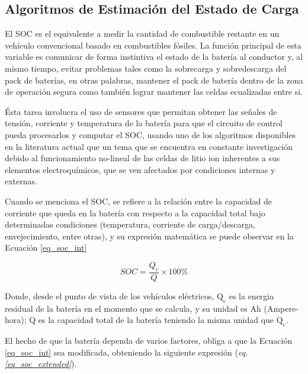 \documentclass[10pt,a4paper]{article}
\begin{document}
\subsection{Algoritmos de Estimaci\'on del Estado de Carga}\label{algSoc}

\noindent El \acrshort{SOC} es el equivalente a medir la cantidad de combustible
restante en un veh\'iculo convencional basado en combustibles f\'osiles. La
funci\'on principal de esta variable es comunicar de forma instintiva el estado
de la bater\'ia al conductor y, al mismo tiempo, evitar problemas tales como la
sobrecarga y sobredescarga del pack de bater\'ias, en otras palabras, mantener
el pack de bater\'ia dentro de la zona de operaci\'on segura como tambi\'en 
lograr mantener las celdas ecualizadas entre si.

\noindent \'Esta tarea involucra el uso de sensores que permitan obtener las
señales de tensi\'on, corriente y temperatura de la bater\'ia para que el
circuito de control pueda procesarlos y computar el \acrshort{SOC},
usando uno de los algoritmos disponibles en la literatura actual que 
un tema que se encuentra en constante investigaci\'on debido al funcionamiento 
no-lineal de las celdas de litio ion inherentes a sus elementos 
electroqu\'imicos, que se  ven afectados por condiciones internas y externas.

\newpage

\noindent Cuando se menciona el \acrshort{SOC}, se refiere a la relaci\'on entre
la capacidad de corriente que queda en la bater\'ia con respecto a la capacidad
total bajo determinadas condiciones (temperatura, corriente de carga/descarga,
envejecimiento, entre otras), y su expresi\'on matem\'atica se puede observar en
la Ecuaci\'on \ref{eq_soc_int}

\begin{equation}
    SOC = \frac{Q_c}{Q}\times100\% 
    \label{eq_soc_int}
\end{equation}

\noindent Donde, desde el punto de vista de los veh\'iculos el\'ectricos,
$\mathrm{Q_c}$ es la energia residual de la bater\'ia en el momento que se
calcula, y su unidad es Ah (Ampere-hora); Q es la capacidad total de la
bater\'ia teniendo la misma unidad que $\mathrm{Q_c}$.

\noindent El hecho de que la bater\'ia dependa de varios factores, obliga a que
la Ecuaci\'on \ref{eq_soc_int} sea modificada, obteniendo la siguiente 
expresi\'on (\emph{eq. \ref{eq_soc_extended}}).
\end{document}
